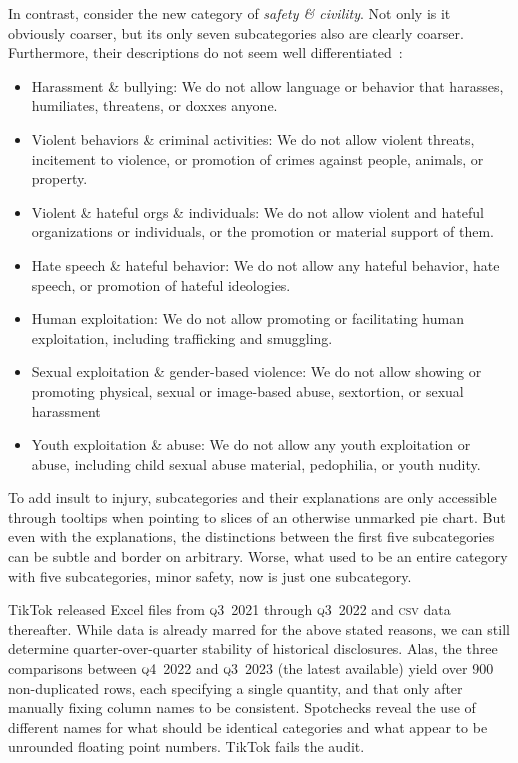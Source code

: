 \documentclass[nonacm,screen]{acmart}
\newcommand\V[1]{\textsc{\MakeLowercase{#1}}}
\begin{document}
\begin{itemize}
{In contrast, consider the new category of \emph{safety \& civility}. Not only is
it obviously coarser, but its only seven subcategories also are clearly coarser.
Furthermore, their descriptions do not seem well
differentiated~\cite{TikTok2023}:
\begin{itemize}
    \item Harassment \& bullying: We do not allow language or behavior that
    harasses, humiliates, threatens, or doxxes anyone.
    \item Violent behaviors \& criminal activities: We do not allow violent
    threats, incitement to violence, or promotion of crimes against people,
    animals, or property.
    \item Violent \& hateful orgs \& individuals: We do not allow violent and
    hateful organizations or individuals, or the promotion or material support
    of them.
    \item Hate speech \& hateful behavior: We do not allow any hateful behavior,
    hate speech, or promotion of hateful ideologies.
    \item Human exploitation: We do not allow promoting or facilitating human
    exploitation, including trafficking and smuggling.
    \item Sexual exploitation \& gender-based violence: We do not allow showing
    or promoting physical, sexual or image-based abuse, sextortion, or sexual
    harassment
    \item Youth exploitation \& abuse: We do not allow any youth exploitation or
    abuse, including child sexual abuse material, pedophilia, or youth nudity.
\end{itemize}
To add insult to injury, subcategories and their explanations are only
accessible through tooltips when pointing to slices of an otherwise unmarked pie
chart. But even with the explanations, the distinctions between the first five
subcategories can be subtle and border on arbitrary. Worse, what used to be an
entire category with five subcategories, minor safety, now is just one
subcategory.

TikTok released Excel files from \V{Q3}~2021 through \V{Q3}~2022 and \V{CSV}
data thereafter. While data is already marred for the above stated reasons, we
can still determine quarter-over-quarter stability of historical disclosures.
Alas, the three comparisons between \V{Q4}~2022 and \V{Q3}~2023 (the latest
available) yield over 900 non-duplicated rows, each specifying a single
quantity, and that only after manually fixing column names to be consistent.
Spotchecks reveal the use of different names for what should be identical
categories and what appear to be unrounded floating point numbers. TikTok fails
the audit.


}
\end{itemize}
\end{document}

